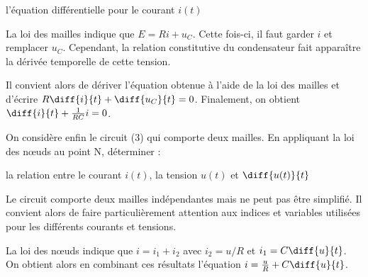 
\begin{enonce}
l'équation différentielle pour le courant $i(t)$ 
\end{enonce}


\begin{corrige}
La loi des mailles indique que $E= Ri + u_C$. Cette fois-ci, il faut garder $i$ et remplacer $u_C$. Cependant, la relation constitutive du condensateur fait apparaître la dérivée temporelle de cette tension. 
\par
Il convient alors de dériver l'équation obtenue à l'aide de la loi des mailles et d'écrire $R \diff{i}{t} +\diff{u_C}{t} = 0 $. Finalement, on obtient $\diff{i}{t} + \frac{1}{RC} i = 0$.
\end{corrige}



\bigskip
On considère enfin le circuit (3) qui comporte deux mailles. En appliquant la loi des nœuds au point N, déterminer :
\minusSmallskip


\begin{enonce}
la relation entre le courant $i(t)$, la tension $u(t)$ et $\diff{u(t)}{t}$ 
\end{enonce}


\begin{corrige}
Le circuit comporte deux mailles indépendantes mais ne peut pas être simplifié. Il convient alors de faire particulièrement attention aux indices et variables utilisées pour les différents courants et tensions.
\par
La loi des nœuds indique que $i=i_1+i_2$ avec $i_2 = u/R$ et $i_1 =C \diff{u}{t}$. On obtient alors en combinant ces résultats l'équation $i = \frac{u}{R} + C \diff{u}{t}$.
\end{corrige}




